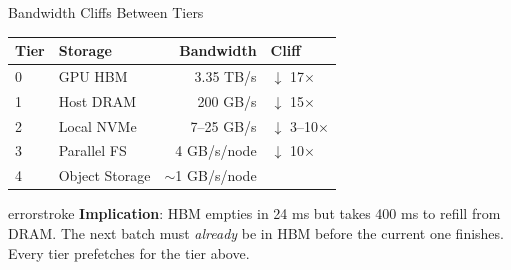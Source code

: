 \documentclass[aspectratio=169, 12pt]{beamer}
\begin{document}
\begin{frame}{Bandwidth Cliffs Between Tiers}

\footnotesize
\renewcommand{\arraystretch}{1.05}
{\scriptsize
\begin{tabular}{@{}llrl@{}}
  \toprule
  \textbf{Tier} & \textbf{Storage} & \textbf{Bandwidth} & \textbf{Cliff} \\
  \midrule
  0 & GPU HBM        & 3.35 TB/s       & \textcolor{errorstroke}{$\downarrow$ 17$\times$} \\
  1 & Host DRAM      & 200 GB/s        & \textcolor{errorstroke}{$\downarrow$ 15$\times$} \\
  2 & Local NVMe     & 7--25 GB/s      & \textcolor{errorstroke}{$\downarrow$ 3--10$\times$} \\
  3 & Parallel FS    & 4 GB/s/node     & \textcolor{errorstroke}{$\downarrow$ 10$\times$} \\
  4 & Object Storage & $\sim$1 GB/s/node & \\
  \bottomrule
\end{tabular}
}

\vspace{0.1cm}
\begin{mlsyscard}{errorstroke}
{\scriptsize \textbf{Implication}: HBM empties in 24 ms but takes 400 ms to refill from DRAM. The next batch must \emph{already} be in HBM before the current one finishes. Every tier prefetches for the tier above.}
\end{mlsyscard}

\end{frame}
\end{document}
